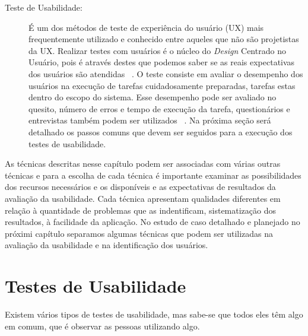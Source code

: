 \begin{description}
\item[Teste de Usabilidade:]

É um dos métodos de teste de experiência do usuário (UX) mais frequentemente utilizado e conhecido entre aqueles que não são projetistas da UX. Realizar testes com usuários é o núcleo do \emph{Design} Centrado no Usuário, pois é através destes que podemos saber se as reais expectativas dos usuários são atendidas ~\cite{santos2012}.
%
O teste consiste em avaliar o desempenho dos usuários na execução de tarefas cuidadosamente preparadas, tarefas estas dentro do escopo do sistema. Esse desempenho pode ser avaliado no quesito, número de erros e tempo de execução da tarefa, questionários e entrevistas também podem ser utilizados ~\cite{preece2007}. Na próxima seção será detalhado os passos comuns que devem ser seguidos para a execução dos testes de usabilidade.


\end{description}

	As técnicas descritas nesse capítulo podem ser associadas com várias outras técnicas e para a escolha de cada técnica é importante examinar as possibilidades dos recursos necessários e os disponíveis e as expectativas de resultados da avaliação da usabilidade. Cada técnica apresentam qualidades diferentes em relação à quantidade de problemas que as indentificam, sistematização dos resultados, à facilidade da aplicação. 
%
No estudo de caso detalhado e planejado no próximi capítulo separamos algumas técnicas que podem ser utilizadas na avaliação da usabilidade e na identificação dos usuários. 

\section{Testes de Usabilidade}

	Existem vários tipos de testes de usabilidade, mas sabe-se que todos eles têm algo em comum, que é observar as pessoas utilizando algo.

